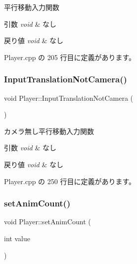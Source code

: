 平行移動入力関数 


\begin{DoxyParams}{引数}
{\em void} & なし \\
\hline
\end{DoxyParams}

\begin{DoxyRetVals}{戻り値}
{\em void} & なし \\
\hline
\end{DoxyRetVals}


 Player.\+cpp の 205 行目に定義があります。

\mbox{\label{class_player_afea84763c80097fa3565b08f4cc4d40f}} 
\subsubsection{\texorpdfstring{Input\+Translation\+Not\+Camera()}{InputTranslationNotCamera()}}
{\footnotesize\ttfamily void Player\+::\+Input\+Translation\+Not\+Camera (\begin{DoxyParamCaption}{ }\end{DoxyParamCaption})\hspace{0.3cm}{\ttfamily [private]}}



カメラ無し平行移動入力関数 


\begin{DoxyParams}{引数}
{\em void} & なし \\
\hline
\end{DoxyParams}

\begin{DoxyRetVals}{戻り値}
{\em void} & なし \\
\hline
\end{DoxyRetVals}


 Player.\+cpp の 250 行目に定義があります。

\mbox{\label{class_player_aecd3f846ad6bb9e7525ef273c4a76f53}} 
\subsubsection{\texorpdfstring{set\+Anim\+Count()}{setAnimCount()}}
{\footnotesize\ttfamily void Player\+::set\+Anim\+Count (\begin{DoxyParamCaption}\item[{int}]{value }\end{DoxyParamCaption})}




